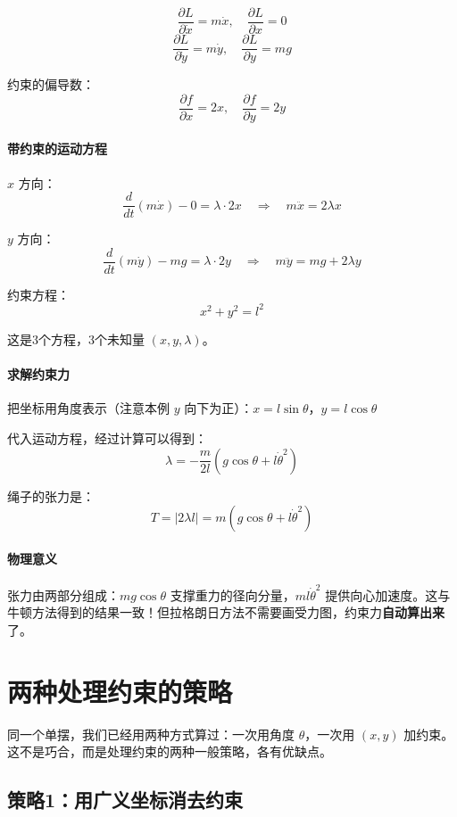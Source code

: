 \[
\frac{\partial L}{\partial \dot{x}} = m\dot{x}, \quad \frac{\partial L}{\partial x} = 0
\]
\[
\frac{\partial L}{\partial \dot{y}} = m\dot{y}, \quad \frac{\partial L}{\partial y} = mg
\]

约束的偏导数：
\[
\frac{\partial f}{\partial x} = 2x, \quad \frac{\partial f}{\partial y} = 2y
\]

\paragraph{带约束的运动方程}

$x$ 方向：
\[
\frac{d}{dt}(m\dot{x}) - 0 = \lambda \cdot 2x \quad \Rightarrow \quad m\ddot{x} = 2\lambda x
\]

$y$ 方向：
\[
\frac{d}{dt}(m\dot{y}) - mg = \lambda \cdot 2y \quad \Rightarrow \quad m\ddot{y} = mg + 2\lambda y
\]

约束方程：
\[
x^2 + y^2 = l^2
\]

这是3个方程，3个未知量 $(x, y, \lambda)$。

\paragraph{求解约束力}

把坐标用角度表示（注意本例 $y$ 向下为正）：$x = l\sin\theta$，$y = l\cos\theta$

代入运动方程，经过计算可以得到：
\[
\lambda = -\frac{m}{2l}(g\cos\theta + l\dot{\theta}^2)
\]

绳子的张力是：
\[
T = |2\lambda l| = m(g\cos\theta + l\dot{\theta}^2)
\]

\paragraph{物理意义}

张力由两部分组成：$mg\cos\theta$ 支撑重力的径向分量，$ml\dot{\theta}^2$ 提供向心加速度。这与牛顿方法得到的结果一致！但拉格朗日方法不需要画受力图，约束力\textbf{自动算出来}了。

\section{两种处理约束的策略}

同一个单摆，我们已经用两种方式算过：一次用角度 $\theta$，一次用 $(x, y)$ 加约束。这不是巧合，而是处理约束的两种一般策略，各有优缺点。

\subsection{策略1：用广义坐标消去约束}


